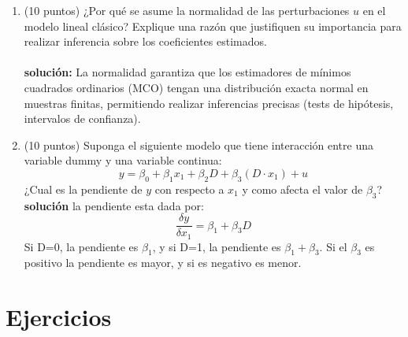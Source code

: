 \documentclass[10pt,a4paper]{article}
\begin{document}
\begin{enumerate}
\item (10 puntos) ¿Por qué se asume la normalidad de las perturbaciones \(u\)
        en el modelo lineal clásico? Explique una razón   que justifiquen su importancia para realizar inferencia
        sobre los coeficientes estimados.
        \\
\\
\textbf{solución:} La normalidad garantiza que los estimadores de mínimos
                cuadrados ordinarios (MCO) tengan una distribución exacta
                normal en muestras finitas, permitiendo realizar inferencias
                precisas (tests de hipótesis, intervalos de confianza).

\item (10 puntos) Suponga el siguiente modelo que tiene interacción entre una variable dummy y una variable continua:
$$y = \beta_0 + \beta_1 x_1 + \beta_2D+\beta_3(D\cdot x_1)+u$$
¿Cual es la pendiente de $y$ con respecto a $x_1$ y como afecta el valor de $\beta_3$?
\\
\textbf{solución} 
la pendiente esta dada por:
$$\frac{\delta y}{\delta x_1} = \beta_1 + \beta_3D$$
Si D=0, la pendiente es $\beta_1$, y si D=1, la pendiente es $\beta_1 + \beta_3$. Si el $\beta_3$ es positivo la pendiente es mayor, y si es negativo es menor.
\end{enumerate}

\section{Ejercicios}
\end{document}
